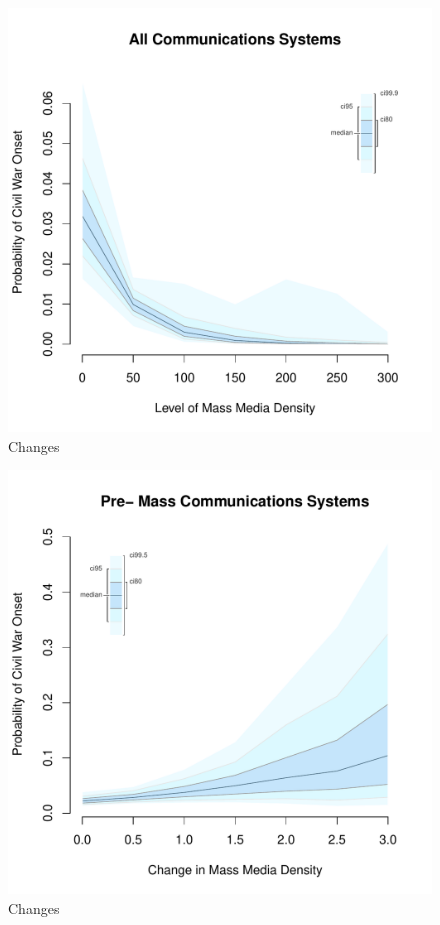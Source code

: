 \documentclass[11pt,article,oneside]{memoir}
\makeatletter
\def\maxwidth{\ifdim\Gin@nat@width>\linewidth\linewidth
\else\Gin@nat@width\fi}
\let\Oldincludegraphics\includegraphics
\renewcommand{\includegraphics}[1]{\Oldincludegraphics[width=\maxwidth]{#1}}
\makeatother
\begin{document}
\begin{figure} 
\includegraphics{figure/mdi_effect.pdf} 
\caption{Changes} 
\label{myFigur} 
\end{figure}

\clearpage

\begin{figure} 
\includegraphics{figure/d_mdi_effect.pdf} 
\caption{Changes} 
\label{myFigz} 
\end{figure}
\end{document}
